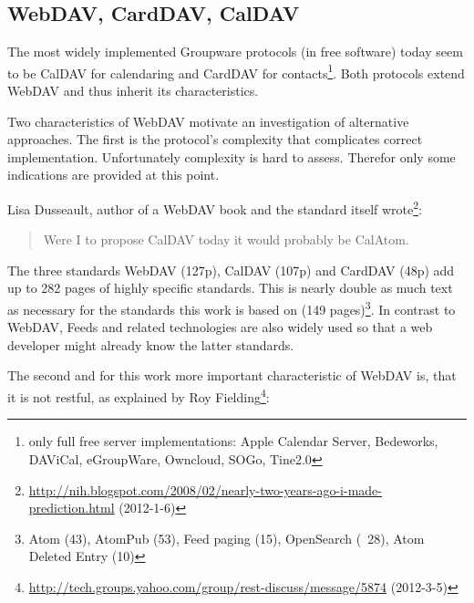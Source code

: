 \documentclass[12pt,a4paper,twoside]{scrartcl}		%
\newcommand{\citeurl}[2]{\url{#1} (#2)}
\begin{document}
\subsection{WebDAV, CardDAV, CalDAV}
\label{sec:carddav-caldav}

The most widely implemented Groupware protocols (in free software) today seem to
be CalDAV\cite{RFC4791} for calendaring and CardDAV\cite{RFC6352} for
contacts\footnote{only full free server implementations: Apple Calendar Server,
  Bedeworks, DAViCal, eGroupWare, Owncloud, SOGo, Tine2.0}. Both protocols
extend WebDAV\cite{RFC4918} and thus inherit its characteristics.

Two characteristics of WebDAV motivate an investigation of alternative
approaches. The first is the protocol's complexity that complicates correct
implementation. Unfortunately complexity is hard to assess. Therefor only some
indications are provided at this point.

Lisa Dusseault, author of a WebDAV book\cite{Dusseault2004} and the standard
itself
wrote\footnote{\citeurl{http://nih.blogspot.com/2008/02/nearly-two-years-ago-i-made-prediction.html}{2012-1-6}}:

\begin{quote}
Were I to propose CalDAV today it would probably be CalAtom.
\end{quote}

The three standards WebDAV (127p), CalDAV (107p) and CardDAV (48p) add up to 282
pages of highly specific standards. This is nearly double as much text as
necessary for the standards this work is based on (149 pages)\footnote{Atom (43),
  AtomPub (53), Feed paging (15), OpenSearch (~28), Atom Deleted Entry (10)}. In
contrast to WebDAV, Feeds and related technologies are also widely used so that
a web developer might already know the latter standards.


The second and for this work more important characteristic of WebDAV is, that it
is not restful, as explained by Roy
Fielding\footnote{\citeurl{http://tech.groups.yahoo.com/group/rest-discuss/message/5874}{2012-3-5}}:
\end{document}
